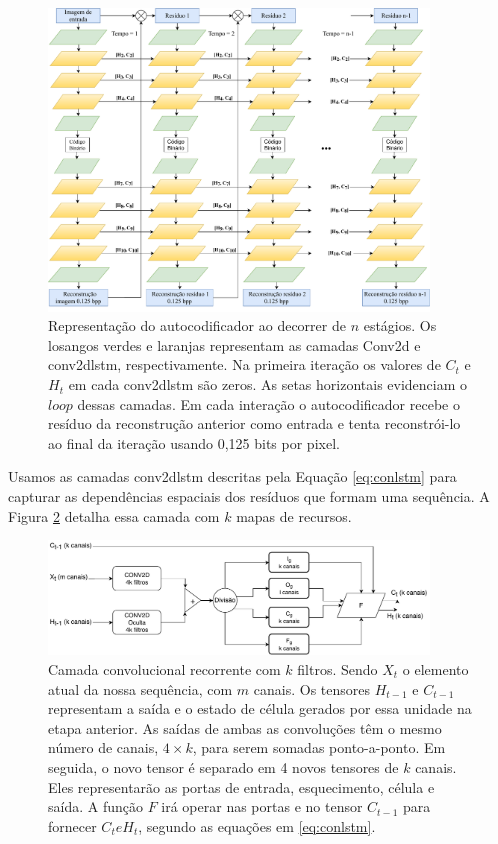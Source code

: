 \begin{figure}
	\centering
	\includegraphics[width=0.90\textwidth]{figuras/redeTCC.pdf}
	\caption[Autocodificador desenrolado no tempo]{Representação do autocodificador ao decorrer de $n$ estágios. Os losangos verdes e laranjas representam as camadas Conv2d e \acrshort{conv2dlstm}, respectivamente.  Na primeira iteração os valores de $C_t$ e  $H_t$ em cada \acrshort{conv2dlstm} são zeros.  As setas horizontais evidenciam o $loop$ dessas camadas. Em cada interação o autocodificador recebe o resíduo da reconstrução anterior como entrada e tenta reconstrói-lo ao final da iteração usando 0,125 bits por pixel. }
	\label{fig:rede_toderici}
\end{figure}

Usamos as camadas \acrshort{conv2dlstm} descritas pela Equação \ref{eq:conlstm} para capturar as dependências espaciais dos resíduos que formam uma sequência. A Figura \ref{fig:convlstm} detalha essa camada com $k$ mapas de recursos. 

\begin{figure}[ht]
	\centering
	\includegraphics[width=0.90\textwidth]{figuras/convlstm.pdf}
	\caption[Conv2DLSTM]{Camada convolucional recorrente com $k$ filtros. Sendo $X_t$ o elemento atual da nossa sequência, com $m$ canais. Os tensores $H_{t-1}$ e $C_{t-1}$ representam a saída e o estado de célula gerados por essa unidade na etapa anterior. As saídas de ambas as convoluções têm o mesmo número de canais, $4\times k$, para serem somadas ponto-a-ponto. Em seguida, o novo tensor é separado em 4 novos tensores de $k$ canais. Eles representarão as portas de entrada, esquecimento, célula e saída. A função $F$ irá operar nas portas e no tensor $C_{t-1}$ para fornecer $C_t e H_t$, segundo as equações em \ref{eq:conlstm}.}
	\label{fig:convlstm}
\end{figure}

